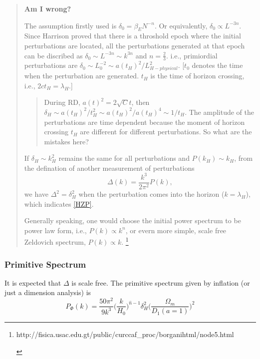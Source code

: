 \documentclass{article}
\begin{document}
\vspace{2ex}
\begin{quote}


{\bf{Am I wrong?}}

The assumption firstly used is $\delta_0=\beta_E N^{-n}$. Or equivalently, $\delta_0\propto L^{-3n}$. Since Harrison proved that there is a throshold epoch where the initial perturbations are located, all the perturbations generated at that epoch can be discribed as $\delta_0\sim L^{-3n} \sim k^{3n}$ and $n=\frac{2}{3}$. i.e., primiordial perturbations are $\delta_0\sim L_0^{-2}\sim a(t_H)^2/L_{H-physical}^2$. [$t_0$ denotes the time when the perturbation are generated. $t_H$ is the time of horizon crossing, i.e., $2ct_H=\lambda_H$.]

\begin{quote}


During RD, $a(t)^2=2\sqrt C t$, then $\delta_H\sim a(t_H)^2/t_H^2 \sim a(t_H)^2/a(t_H)^4 \sim 1/t_H$. The amplitude of the perturbations are time dependent because the moment of horizon crossing $t_H$ are different for different perturbations. So what are the mistakes here?
\end{quote}


If $\delta_H\sim k_H^2$ remains the same for all perturbations and $P(k_H)\sim k_H$, from the defination of another measurement of perturbations
\begin{equation}\Delta(k)=\frac{k^3}{2\pi^2}P(k),
\end{equation}
we have $\Delta^2=\delta_H^2$ when the perturbation comes into the horizon ($k=\lambda_H$), which indicates \ref{HZP}.

Generally speaking, one would choose the initial power spectrum to be power law form, i.e., $P(k)\propto k^n$, or evern more simple, scale free Zeldovich spectrum, $P(k)\propto k$.
\footnote{\begin{url} {http://fisica.usac.edu.gt/public/curccaf_proc/borganihtml/node5.html}
\end{url}
}
 
\end{quote}


\subsubsection{Primitive Spectrum}
It is expected that $\Delta$ is scale free.
The primitive spectrum given by inflation (or just a dimension analysis) is
\begin{equation}
P_\Phi(k)=\frac{50\pi^2}{9k^3}\bigg( \frac{k}{H_0} \bigg)^{\hat{n}-1}\delta_H^2\bigg(\frac{\Omega_m}{D_1(a=1)}\bigg)^2
\end{equation}
\end{document}
